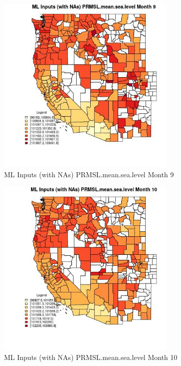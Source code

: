 \begin{figure} 
\centering  
\includegraphics[width=0.77\textwidth]{Code_Outputs/Report_ML_input_PM25_Step4_part_e_de_duplicated_aves_compiled_2019-05-21wNAs_CountyPRMSLmeansealevelmedianMonth9.jpg} 
\caption{\label{fig:Report_ML_input_PM25_Step4_part_e_de_duplicated_aves_compiled_2019-05-21wNAsCountyPRMSLmeansealevelmedianMonth9}ML Inputs (with NAs) PRMSL.mean.sea.level Month 9} 
\end{figure} 
 

\begin{figure} 
\centering  
\includegraphics[width=0.77\textwidth]{Code_Outputs/Report_ML_input_PM25_Step4_part_e_de_duplicated_aves_compiled_2019-05-21wNAs_CountyPRMSLmeansealevelmedianMonth10.jpg} 
\caption{\label{fig:Report_ML_input_PM25_Step4_part_e_de_duplicated_aves_compiled_2019-05-21wNAsCountyPRMSLmeansealevelmedianMonth10}ML Inputs (with NAs) PRMSL.mean.sea.level Month 10} 
\end{figure} 
 

